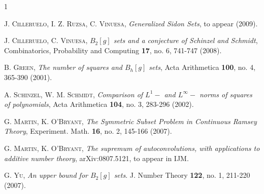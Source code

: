 \documentclass[12pt]{amsart}
\theoremstyle{definition}
\begin{document}
\begin{thebibliography}{1}

  \textsc{J. Cilleruelo, I. Z. Ruzsa, C. Vinuesa},
  \emph{Generalized Sidon Sets},
  to appear (2009).

  \textsc{J. Cilleruelo, C. Vinuesa},
  \emph{$B_2[g]$ sets and a conjecture of Schinzel and Schmidt},
  Combinatorics, Probability and Computing \textbf{17}, no. 6, 741-747 (2008).

  \textsc{B. Green},
  \emph{The number of squares and $B_h[g]$ sets},
  Acta Arithmetica \textbf{100}, no. 4, 365-390 (2001).

  \textsc{A. Schinzel, W. M. Schmidt},
  \emph{Comparison of $L^1-$ and $L^{\infty}-$ norms of squares of polynomials},
  Acta Arithmetica \textbf{104}, no. 3, 283-296 (2002).

  \textsc{G. Martin, K. O'Bryant},
  \emph{The Symmetric Subset Problem in Continuous Ramsey Theory},
  Experiment. Math. \textbf{16}, no. 2, 145-166 (2007).

  \textsc{G. Martin, K. O'Bryant},
  \emph{The supremum of autoconvolutions, with applications to additive number theory},
  arXiv:0807.5121, to appear in IJM.

  \textsc{G. Yu},
  \emph{An upper bound for $B_2[g]$ sets}.
  J. Number Theory \textbf{122}, no. 1, 211-220 (2007).

\end{thebibliography}
\end{document}
